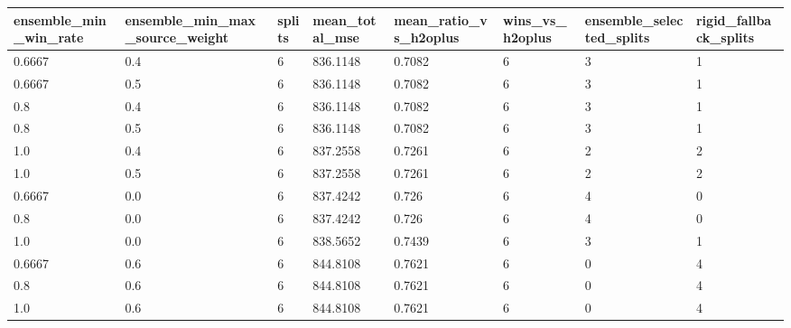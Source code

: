 \begin{tabular}{llllllll}
\toprule
ensemble\_min\_win\_rate & ensemble\_min\_max\_source\_weight & splits & mean\_total\_mse & mean\_ratio\_vs\_h2oplus & wins\_vs\_h2oplus & ensemble\_selected\_splits & rigid\_fallback\_splits \\
\midrule
0.6667 & 0.4 & 6 & 836.1148 & 0.7082 & 6 & 3 & 1 \\
0.6667 & 0.5 & 6 & 836.1148 & 0.7082 & 6 & 3 & 1 \\
0.8 & 0.4 & 6 & 836.1148 & 0.7082 & 6 & 3 & 1 \\
0.8 & 0.5 & 6 & 836.1148 & 0.7082 & 6 & 3 & 1 \\
1.0 & 0.4 & 6 & 837.2558 & 0.7261 & 6 & 2 & 2 \\
1.0 & 0.5 & 6 & 837.2558 & 0.7261 & 6 & 2 & 2 \\
0.6667 & 0.0 & 6 & 837.4242 & 0.726 & 6 & 4 & 0 \\
0.8 & 0.0 & 6 & 837.4242 & 0.726 & 6 & 4 & 0 \\
1.0 & 0.0 & 6 & 838.5652 & 0.7439 & 6 & 3 & 1 \\
0.6667 & 0.6 & 6 & 844.8108 & 0.7621 & 6 & 0 & 4 \\
0.8 & 0.6 & 6 & 844.8108 & 0.7621 & 6 & 0 & 4 \\
1.0 & 0.6 & 6 & 844.8108 & 0.7621 & 6 & 0 & 4 \\
\bottomrule
\end{tabular}
